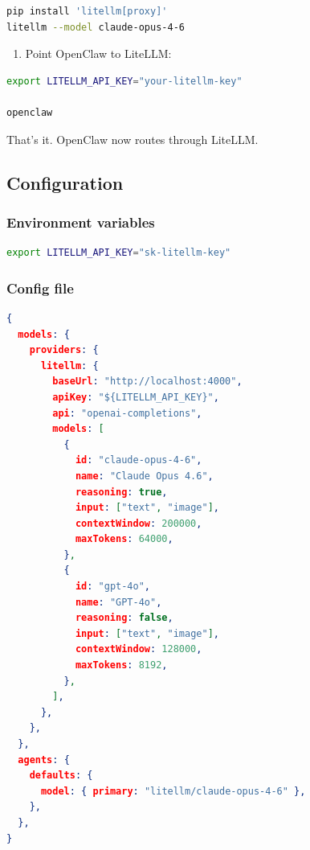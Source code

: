 \begin{lstlisting}[language=bash]
pip install 'litellm[proxy]'
litellm --model claude-opus-4-6
\end{lstlisting}


\begin{enumerate}
  \item Point OpenClaw to LiteLLM:
\end{enumerate}


\begin{lstlisting}[language=bash]
export LITELLM_API_KEY="your-litellm-key"

openclaw
\end{lstlisting}


That's it. OpenClaw now routes through LiteLLM.

\subsection{Configuration}


\subsubsection{Environment variables}


\begin{lstlisting}[language=bash]
export LITELLM_API_KEY="sk-litellm-key"
\end{lstlisting}


\subsubsection{Config file}


\begin{lstlisting}[language=json]
{
  models: {
    providers: {
      litellm: {
        baseUrl: "http://localhost:4000",
        apiKey: "${LITELLM_API_KEY}",
        api: "openai-completions",
        models: [
          {
            id: "claude-opus-4-6",
            name: "Claude Opus 4.6",
            reasoning: true,
            input: ["text", "image"],
            contextWindow: 200000,
            maxTokens: 64000,
          },
          {
            id: "gpt-4o",
            name: "GPT-4o",
            reasoning: false,
            input: ["text", "image"],
            contextWindow: 128000,
            maxTokens: 8192,
          },
        ],
      },
    },
  },
  agents: {
    defaults: {
      model: { primary: "litellm/claude-opus-4-6" },
    },
  },
}
\end{lstlisting}


